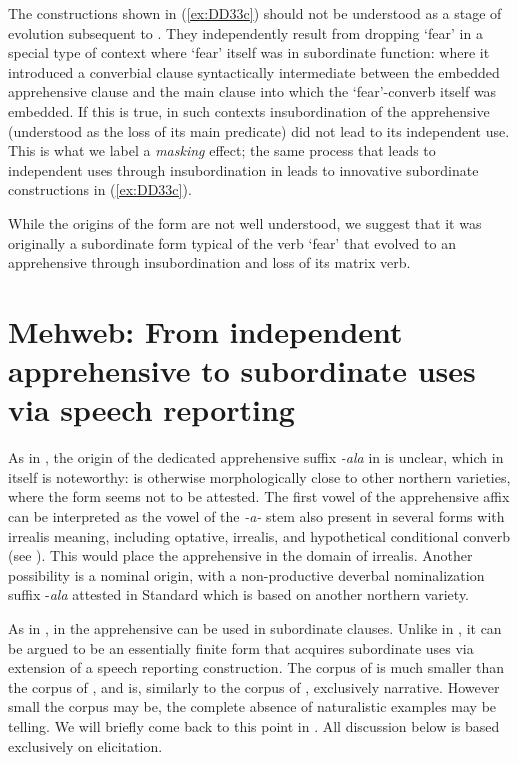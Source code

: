\documentclass[output=paper,colorlinks,citecolor=brown]{langscibook}
\begin{document}
\noindent The constructions shown in (\ref{ex:DD33c}) should not be understood as a stage of evolution subsequent to . They independently result from dropping `fear' in a special type of context where `fear' itself was in subordinate function: where it introduced a converbial clause syntactically intermediate between the embedded apprehensive clause and the main clause into which the `fear'-converb itself was embedded. If this is true, in such contexts insubordination of the apprehensive (understood as the loss of its main predicate) did not lead to its independent use. This is what we label a \textit{masking} effect; the same process that leads to independent uses through insubordination in  leads to innovative subordinate constructions in (\ref{ex:DD33c}).  

While the origins of the form are not well understood, we suggest that it was originally a subordinate form typical of the verb `fear' that evolved to an apprehensive through insubordination and loss of its matrix verb. 
 
 
 
 
 
 

\section{Mehweb: From independent apprehensive to subordinate uses via speech reporting}
\label{sec:Mehweb}
 
As in , the origin of the dedicated apprehensive suffix \textit{-ala} in  is unclear, which in itself is noteworthy:  is otherwise morphologically close to other northern  varieties, where the form seems not to be attested. The first vowel of the apprehensive affix can be interpreted as the vowel of the \textit{-a-} stem also present in several forms with irrealis meaning, including optative, irrealis, and hypothetical conditional converb (see \citealt{Daniel2019,Dobrushina2019}). This would place the apprehensive in the domain of irrealis. Another possibility is a nominal origin, with a non-productive deverbal nominalization suffix \nobreakdash-\textit{ala} attested in Standard  which is based on another northern  variety. 

As in , in  the apprehensive can be used in subordinate clauses. Unlike in , it can be argued to be an essentially finite form that acquires subordinate uses via extension of a speech reporting construction. The corpus of  is much smaller than the corpus of , and is, similarly to the corpus of , exclusively narrative. However small the corpus may be, the complete absence of naturalistic examples may be telling. We will briefly come back to this point in . All discussion below is based exclusively on elicitation.
\end{document}
